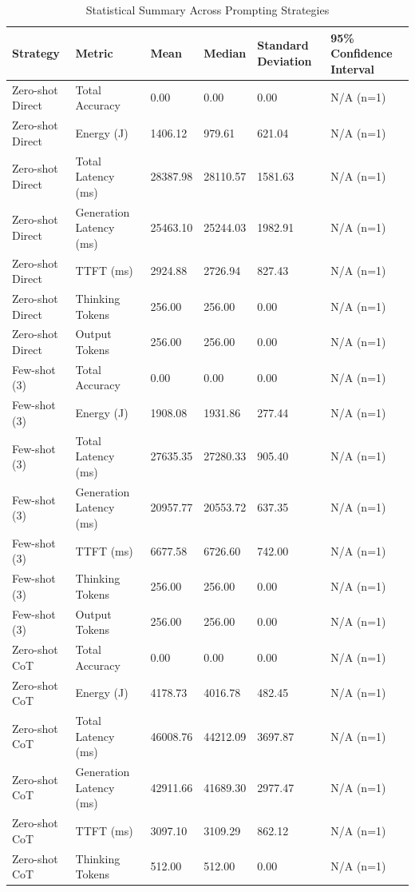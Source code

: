 \begin{table}
\caption{Statistical Summary Across Prompting Strategies}
\label{tab:statistical_summary}
\begin{tabular}{llllll}
\toprule
Strategy & Metric & Mean & Median & Standard Deviation & 95\% Confidence Interval \\
\midrule
Zero-shot Direct & Total Accuracy & 0.00 & 0.00 & 0.00 & N/A (n=1) \\
Zero-shot Direct & Energy (J) & 1406.12 & 979.61 & 621.04 & N/A (n=1) \\
Zero-shot Direct & Total Latency (ms) & 28387.98 & 28110.57 & 1581.63 & N/A (n=1) \\
Zero-shot Direct & Generation Latency (ms) & 25463.10 & 25244.03 & 1982.91 & N/A (n=1) \\
Zero-shot Direct & TTFT (ms) & 2924.88 & 2726.94 & 827.43 & N/A (n=1) \\
Zero-shot Direct & Thinking Tokens & 256.00 & 256.00 & 0.00 & N/A (n=1) \\
Zero-shot Direct & Output Tokens & 256.00 & 256.00 & 0.00 & N/A (n=1) \\
Few-shot (3) & Total Accuracy & 0.00 & 0.00 & 0.00 & N/A (n=1) \\
Few-shot (3) & Energy (J) & 1908.08 & 1931.86 & 277.44 & N/A (n=1) \\
Few-shot (3) & Total Latency (ms) & 27635.35 & 27280.33 & 905.40 & N/A (n=1) \\
Few-shot (3) & Generation Latency (ms) & 20957.77 & 20553.72 & 637.35 & N/A (n=1) \\
Few-shot (3) & TTFT (ms) & 6677.58 & 6726.60 & 742.00 & N/A (n=1) \\
Few-shot (3) & Thinking Tokens & 256.00 & 256.00 & 0.00 & N/A (n=1) \\
Few-shot (3) & Output Tokens & 256.00 & 256.00 & 0.00 & N/A (n=1) \\
Zero-shot CoT & Total Accuracy & 0.00 & 0.00 & 0.00 & N/A (n=1) \\
Zero-shot CoT & Energy (J) & 4178.73 & 4016.78 & 482.45 & N/A (n=1) \\
Zero-shot CoT & Total Latency (ms) & 46008.76 & 44212.09 & 3697.87 & N/A (n=1) \\
Zero-shot CoT & Generation Latency (ms) & 42911.66 & 41689.30 & 2977.47 & N/A (n=1) \\
Zero-shot CoT & TTFT (ms) & 3097.10 & 3109.29 & 862.12 & N/A (n=1) \\
Zero-shot CoT & Thinking Tokens & 512.00 & 512.00 & 0.00 & N/A (n=1) \\

\end{tabular}
\end{table}
